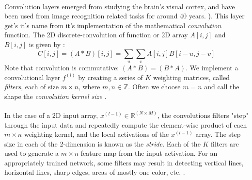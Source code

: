 \documentclass[12pt,letterpaper]{article}
\begin{document}
\paragraph*{}Convolution layers emerged from studying the brain's visual cortex, and have been used from image recognition related tasks for around 40 years. \cite{Geron,Loy}). This layer get's it's name from it's implementation of the mathematical \textit{convolution} function. The 2D discrete-convolution of function or 2D array $A[i,j]$ and $B[i,j]$ is given by \cite{Goodfellow}:
\begin{equation}
\label{eqn-convolution}
C[i,j] = (A * B)[i,j] = \sum_{u}\sum_{v} A[i,j]B[i - u,j - v]
\end{equation}
Note that convolution is commutative: $(A * B) = (B * A)$. We implement a convolutional layer $f^{(l)}$ by creating a series of $K$ weighting matrices, called \textit{filters}, each of size $m \times n$, where $m,n \in \mathbb{Z}$. Often we choose $m = n$ and call the shape the \textit{convolution kernel size} \cite{Loy, Goodfellow}.

\paragraph*{}In the case of a 2D input array, $x^{(l-1)} \in \mathbb{R}^{(N \times M)}$, the convolutions filters "step" through the input data and repeatedly compute the element-wise product of each $m \times n$ weighting kernel, and the local activations of the $x^{(l-1)}$ array. The step size in each of the 2-dimension is known as the \textit{stride}. Each of the $K$ filters are used to generate a $m \times n$ feature map from the input activation. For an appropriately trained network, some filters may result in detecting vertical lines, horizontal lines, sharp edges, areas of mostly one color, etc. \cite{Geron,Loy}.
\end{document}
